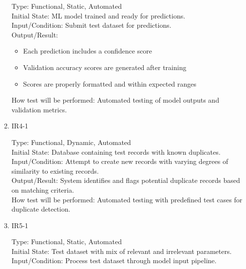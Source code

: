 \documentclass[12pt, titlepage]{article}
\begin{document}
\begin{enumerate}
    Type: Functional, Static, Automated\\
    
    Initial State: ML model trained and ready for predictions.\\
    
    Input/Condition: Submit test dataset for predictions.\\
    
    Output/Result: 
    \begin{itemize}
        \item Each prediction includes a confidence score
        \item Validation accuracy scores are generated after training
        \item Scores are properly formatted and within expected ranges
    \end{itemize}
    
    How test will be performed: Automated testing of model outputs and validation metrics.

    \item{IR4-1\\}
    
    Type: Functional, Dynamic, Automated\\
    
    Initial State: Database containing test records with known duplicates.\\
    
    Input/Condition: Attempt to create new records with varying degrees of similarity to existing records.\\
    
    Output/Result: System identifies and flags potential duplicate records based on matching criteria.\\
    
    How test will be performed: Automated testing with predefined test cases for duplicate detection.

    \item{IR5-1\\}
    
    Type: Functional, Static, Automated\\
    
    Initial State: Test dataset with mix of relevant and irrelevant parameters.\\
    
    Input/Condition: Process test dataset through model input pipeline.\\
    

\end{enumerate}
\end{document}
